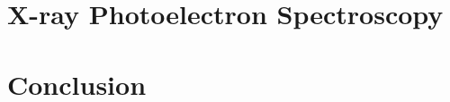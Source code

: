 \documentclass[xcolor=table, t, 9pt, head=0cm]{beamer}
\begin{document}
    \section{X-ray Photoelectron Spectroscopy}
    
    
    
    

    \section{Conclusion}
    
    

\appendix
    
    
\end{document}
